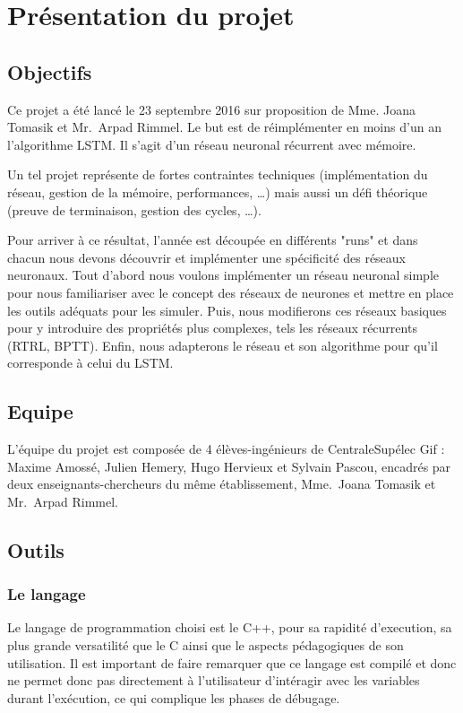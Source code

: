 
\chapter{Présentation du projet}

\section{Objectifs}

Ce projet a été lancé le 23 septembre 2016 sur proposition de Mme. Joana Tomasik
et Mr.\ Arpad Rimmel. Le but est de réimplémenter en moins d'un an l'algorithme
LSTM\footnotemark. Il s'agit d'un réseau neuronal récurrent avec mémoire.


\bigskip

Un tel projet représente de fortes contraintes techniques (implémentation du
 réseau, gestion de la mémoire, performances, \ldots) mais aussi un défi
 théorique (preuve de terminaison, gestion des cycles, \ldots).

\bigskip

Pour arriver à ce résultat, l'année est découpée en différents "runs" et dans
chacun nous devons découvrir et implémenter une spécificité des réseaux
neuronaux.
Tout d'abord nous voulons implémenter un réseau neuronal simple pour
nous familiariser avec le concept des réseaux de neurones et mettre en place
les outils adéquats pour les simuler. Puis, nous modifierons ces réseaux
basiques pour y introduire des propriétés plus complexes, tels les réseaux
récurrents (RTRL, BPTT). Enfin, nous adapterons le réseau et son algorithme pour
qu'il corresponde à celui du LSTM.

\section{Equipe}

L'équipe du projet est composée de 4 élèves-ingénieurs de CentraleSupélec Gif :
Maxime Amossé, Julien Hemery, Hugo Hervieux et Sylvain Pascou, encadrés par deux
enseignants-chercheurs du même établissement, Mme.\ Joana Tomasik et Mr.\ Arpad
Rimmel.

\section{Outils}

\subsection{Le langage}
Le langage de programmation choisi est le C++, pour sa rapidité d'execution,
sa plus grande versatilité que le C ainsi que le aspects pédagogiques de son
utilisation. Il est important de faire remarquer que ce langage est compilé et
donc ne permet donc pas directement à l'utilisateur d'intéragir avec les
variables durant l'exécution, ce qui complique les phases de débugage.

